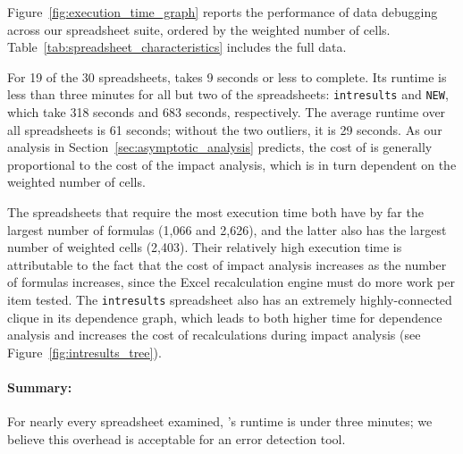 Figure~\ref{fig:execution_time_graph} reports the performance of data
debugging across our spreadsheet suite, ordered by the weighted number
of cells. Table~\ref{tab:spreadsheet_characteristics} includes the full data.

For 19 of the 30 spreadsheets, \checkcell{} takes 9 seconds or less to
complete. Its runtime is less than three minutes for all but two of
the spreadsheets: \texttt{intresults} and \texttt{NEW}, which take 318
seconds and 683 seconds, respectively. The average runtime over all
spreadsheets is 61 seconds; without the two outliers, it is 29
seconds. As our analysis in Section~\ref{sec:asymptotic_analysis}
predicts, the cost of \checkcell{} is generally proportional to the
cost of the impact analysis, which is in turn dependent on the
weighted number of cells.

The spreadsheets that require the most execution time both have by far
the largest number of formulas (1,066 and 2,626), and the latter also
has the largest number of weighted cells (2,403). Their relatively
high execution time is attributable to the fact that the cost of impact
analysis increases as the number of formulas increases, since the
Excel recalculation engine must do more work per item tested. The
\texttt{intresults} spreadsheet also has an extremely highly-connected
clique in its dependence graph, which leads to both higher time for
dependence analysis and increases the cost of recalculations during
impact analysis (see Figure~\ref{fig:intresults_tree}).

\paragraph{Summary:} For nearly every spreadsheet
 examined, \checkcell{}'s runtime is under three minutes; we believe
 this overhead is acceptable for an error detection tool.





